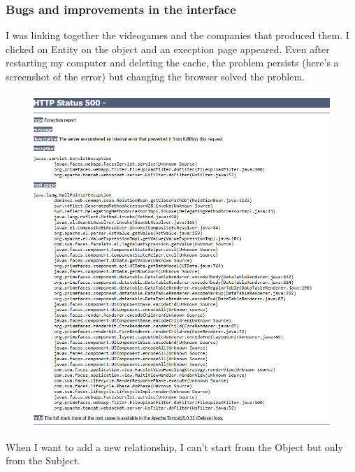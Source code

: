 \subsubsection{Bugs and improvements in the interface}
I was linking together the videogames and the companies that produced them. I clicked on Entity on the object and an execption page appeared. 
Even after restarting my computer and deleting the cache, the problem persists (here's a screenshot of the error) but changing the browser solved the problem.
\begin{figure}[H]
    \centering
    \includegraphics[scale=0.5]{images/exception1.png}
\end{figure}

When I want to add a new relationship, I can't start from the Object but only from the Subject.